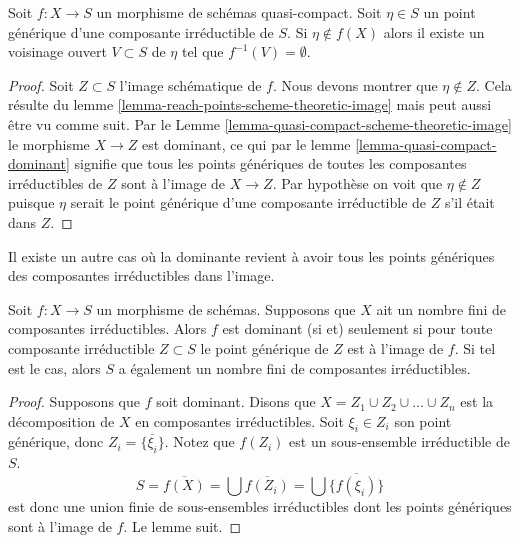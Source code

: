 \begin{lemma}
\label{lemma-quasi-compact-generic-point-not-in-image}
Soit $f : X \to S$ un morphisme de schémas quasi-compact.
Soit $\eta \in S$ un point générique d'une composante
irréductible de $S$. Si $\eta \not \in f(X)$ alors
il existe un voisinage ouvert $V \subset S$ de
$\eta$ tel que $f^{-1}(V) = \emptyset$.
\end{lemma}

\begin{proof}
Soit $Z \subset S$ l'image schématique de $f$.
Nous devons montrer que $\eta \not \in Z$.
Cela résulte du
lemme \ref{lemma-reach-points-scheme-theoretic-image} mais peut aussi être vu comme suit.
Par le Lemme \ref{lemma-quasi-compact-scheme-theoretic-image} le morphisme
$X \to Z$ est dominant, ce qui par le lemme
\ref{lemma-quasi-compact-dominant} signifie que tous les points
génériques de toutes les composantes
irréductibles de $Z$ sont à l'image de $X \to Z$.
Par hypothèse on voit que $\eta \not \in Z$ puisque $\eta$
serait le point générique d'une composante
irréductible de $Z$ s'il était dans $Z$.
\end{proof}

\noindent
Il existe un autre cas où la dominante revient à avoir tous les points
génériques des composantes irréductibles dans l'image.

\begin{lemma}
\label{lemma-dominant-finite-number-irreducible-components}
Soit $f : X \to S$ un morphisme de schémas. Supposons que
$X$ ait un nombre fini de composantes irréductibles. Alors $f$
est dominant (si et) seulement si pour toute composante irréductible
$Z \subset S$ le point générique de $Z$ est à l'image de $f$.
Si tel est le cas, alors $S$ a également un nombre fini de composantes
irréductibles.
\end{lemma}

\begin{proof}
Supposons que $f$
soit dominant. Disons que $X = Z_1 \cup Z_2 \cup \ldots \cup Z_n$ est la décomposition de $X$
en composantes irréductibles. Soit $\xi_i \in Z_i$ son
point générique, donc $Z_i = \overline{\{\xi_i\}}$. Notez que $f(Z_i)$
est un sous-ensemble irréductible de
$S$.
$$
S = \overline{f(X)} = \bigcup \overline{f(Z_i)} =
\bigcup \overline{\{f(\xi_i)\}}
$$
est donc une union finie de sous-ensembles irréductibles dont les points
génériques sont à l'image de $f$. Le lemme suit.
\end{proof}

